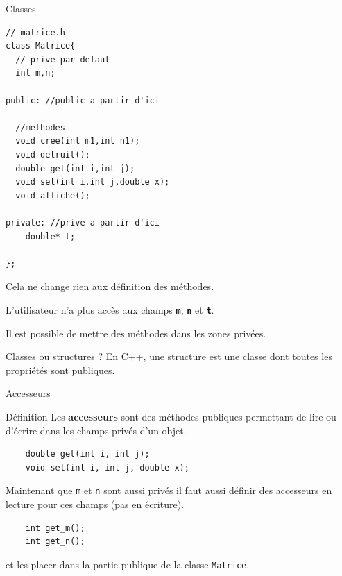 \begin{frame}[fragile]{Classes}
    \begin{minipage}{0.47\linewidth}
        
            \begin{verbatim}
// matrice.h
class Matrice{
  // prive par defaut
  int m,n;

public: //public a partir d'ici

  //methodes
  void cree(int m1,int n1);
  void detruit();
  double get(int i,int j);
  void set(int i,int j,double x);
  void affiche();

private: //prive a partir d'ici
    double* t;

};
            \end{verbatim}
        
    \end{minipage}
    \hfill
    \begin{minipage}{0.47\linewidth}
Cela ne change rien aux définition des méthodes.

\vspace{0.3cm}
L'utilisateur n'a plus accès aux champs \texttt{\textbf{m}}, \texttt{\textbf{n}} et \texttt{\textbf{t}}.

\vspace{0.3cm}
Il est possible de mettre des méthodes dans les zones privées.
    \end{minipage}
\end{frame}


\begin{frame}{Classes ou structures ?}
    En C++, une structure est une classe dont toutes les propriétés sont publiques.
\end{frame}

\begin{frame}[fragile]{Accesseurs}
    \begin{block}{Définition}
    Les \textbf{accesseurs} sont des méthodes publiques permettant de lire ou d'écrire dans les champs privés d'un objet.
    \end{block}

    
        \begin{verbatim}
    double get(int i, int j);
    void set(int i, int j, double x);
        \end{verbatim}
    

    Maintenant que \texttt{m} et \texttt{n} sont aussi privés il faut aussi définir des accesseurs en lecture pour ces champs (pas en écriture).

        \begin{verbatim}
    int get_m();
    int get_n();
        \end{verbatim}

    et les placer dans la partie publique de la classe \texttt{Matrice}.
\end{frame}

